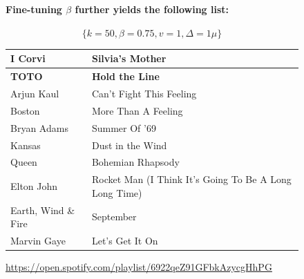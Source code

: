 \documentclass[a4paper, 12pt]{report}
\begin{document}
\begin{figure}[H]
    \paragraph{Fine-tuning \(\beta\) further yields the following list:}
    \[\{k = 50, \beta = 0.75, v = 1, \Delta = 1\mu\}\]
    \begin{center}
        \begin{tabulary}{\linewidth}{|@{\makebox[2em][c]{\rownumber}}|L|L|} 
            \hline
            I Corvi & Silvia's Mother \\ 
            \hline
            \textbf{TOTO} & \textbf{Hold the Line} \\
            \hline
            Arjun Kaul & Can't Fight This Feeling \\
            \hline
            Boston & More Than A Feeling \\
            \hline
            Bryan Adams & Summer Of '69 \\
            \hline
            Kansas & Dust in the Wind \\
            \hline
            Queen & Bohemian Rhapsody \\
            \hline
            Elton John & Rocket Man (I Think It's Going To Be A Long Long Time) \\
            \hline
            Earth, Wind \& Fire & September \\
            \hline
            Marvin Gaye & Let's Get It On \\
            \hline
        \end{tabulary}
    \caption{\url{https://open.spotify.com/playlist/6922qeZ91GFbkAzycgHhPG}}
    \end{center}
\end{figure}
\end{document}
